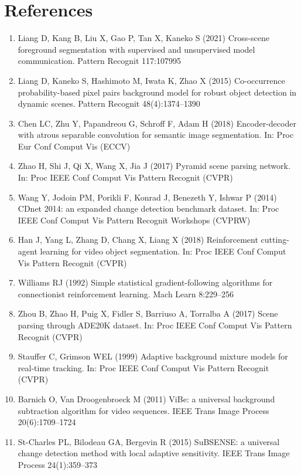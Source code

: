 \documentclass[sn-basic]{sn-jnl}
\begin{document}
\section*{References}
\small
\begin{enumerate}\itemsep1pt
\item[{[1]}] Liang D, Kang B, Liu X, Gao P, Tan X, Kaneko S (2021) Cross-scene foreground segmentation with supervised and unsupervised model communication. Pattern Recognit 117:107995
\item[{[2]}] Liang D, Kaneko S, Hashimoto M, Iwata K, Zhao X (2015) Co-occurrence probability-based pixel pairs background model for robust object detection in dynamic scenes. Pattern Recognit 48(4):1374--1390
\item[{[3]}] Chen LC, Zhu Y, Papandreou G, Schroff F, Adam H (2018) Encoder-decoder with atrous separable convolution for semantic image segmentation. In: Proc Eur Conf Comput Vis (ECCV)
\item[{[4]}] Zhao H, Shi J, Qi X, Wang X, Jia J (2017) Pyramid scene parsing network. In: Proc IEEE Conf Comput Vis Pattern Recognit (CVPR)
\item[{[5]}] Wang Y, Jodoin PM, Porikli F, Konrad J, Benezeth Y, Ishwar P (2014) CDnet 2014: an expanded change detection benchmark dataset. In: Proc IEEE Conf Comput Vis Pattern Recognit Workshops (CVPRW)
\item[{[6]}] Han J, Yang L, Zhang D, Chang X, Liang X (2018) Reinforcement cutting-agent learning for video object segmentation. In: Proc IEEE Conf Comput Vis Pattern Recognit (CVPR)
\item[{[7]}] Williams RJ (1992) Simple statistical gradient-following algorithms for connectionist reinforcement learning. Mach Learn 8:229--256
\item[{[8]}] Zhou B, Zhao H, Puig X, Fidler S, Barriuso A, Torralba A (2017) Scene parsing through ADE20K dataset. In: Proc IEEE Conf Comput Vis Pattern Recognit (CVPR)
\item[{[9]}] Stauffer C, Grimson WEL (1999) Adaptive background mixture models for real-time tracking. In: Proc IEEE Conf Comput Vis Pattern Recognit (CVPR)
\item[{[10]}] Barnich O, Van Droogenbroeck M (2011) ViBe: a universal background subtraction algorithm for video sequences. IEEE Trans Image Process 20(6):1709--1724
\item[{[11]}] St-Charles PL, Bilodeau GA, Bergevin R (2015) SuBSENSE: a universal change detection method with local adaptive sensitivity. IEEE Trans Image Process 24(1):359--373

\end{enumerate}
\end{document}
